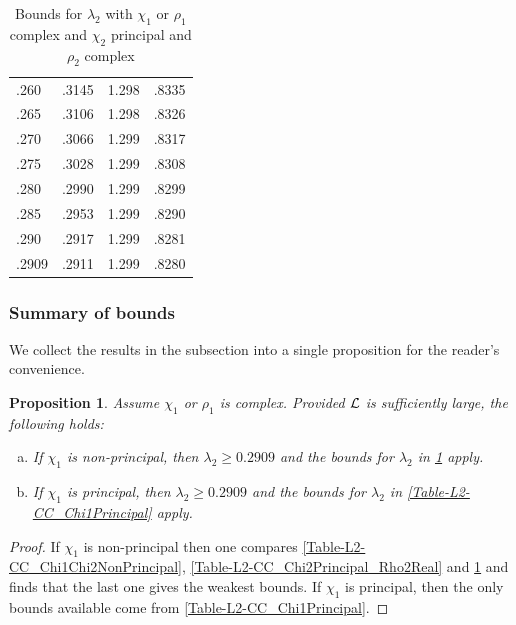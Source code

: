 \documentclass[12pt,psamsfonts]{amsart}
\newtheorem{prop}[thm]{Proposition}
\theoremstyle{definition}
\theoremstyle{remark}
\numberwithin{equation}{section}
\begin{document}
\begin{table}
\begin{tabular}{l|c|c|c}
 .260 &  .3145 &  1.298 &  .8335 \\ 
 .265 &  .3106 &  1.298 &  .8326 \\ 
 .270 &  .3066 &  1.299 &  .8317 \\ 
 .275 &  .3028 &  1.299 &  .8308 \\ 
 .280 &  .2990 &  1.299 &  .8299 \\ 
 .285 &  .2953 &  1.299 &  .8290 \\ 
 .290 &  .2917 &  1.299 &  .8281 \\ 
 .2909 &  .2911 &  1.299 &  .8280 \\ 
\end{tabular}
\caption{Bounds for $\lambda_2$ with  $\chi_1$ or $\rho_1$ complex and  $\chi_2$ principal and $\rho_2$ complex}
\label{Table-L2-CC_Chi2Principal_Rho2Complex}
\end{table}


\subsubsection{Summary of bounds} We collect the results in the subsection into a single proposition for the reader's convenience. 

\begin{prop} \label{Bounds-L2-CC}
Assume $\chi_1$ or $\rho_1$ is complex. Provided $\mathcal{L}$ is sufficiently large, the following holds:

\begin{enumerate}[(a)]
	\item If $\chi_1$ is non-principal, then  $\lambda_2 \geq 0.2909$ and the bounds for $\lambda_2$ in \cref{Table-L2-CC_Chi2Principal_Rho2Complex} apply. 
	\item If $\chi_1$ is principal, then $\lambda_2 \geq 0.2909$ and the bounds for $\lambda_2$ in \cref{Table-L2-CC_Chi1Principal} apply. 
\end{enumerate}
\end{prop}
\begin{proof} If $\chi_1$ is non-principal then one compares \cref{Table-L2-CC_Chi1Chi2NonPrincipal}, \cref{Table-L2-CC_Chi2Principal_Rho2Real} and \cref{Table-L2-CC_Chi2Principal_Rho2Complex} and finds that the last one gives the weakest bounds. If $\chi_1$ is principal, then the only bounds available come from \cref{Table-L2-CC_Chi1Principal}. 
\end{proof}




\end{document}
